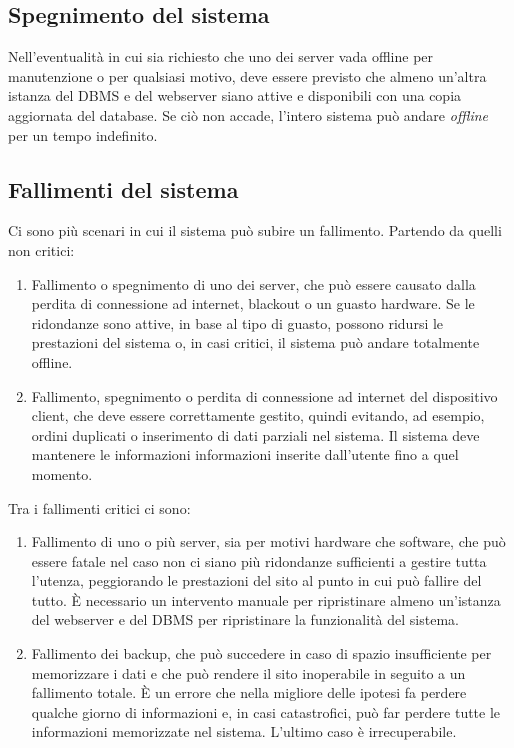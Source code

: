 \documentclass[12pt,a4paper]{article}
\begin{document}
\subsection{Spegnimento del sistema}
Nell'eventualità in cui sia richiesto che uno dei server vada offline per manutenzione o per qualsiasi motivo, deve essere previsto che almeno un'altra istanza del DBMS e del webserver siano attive e disponibili con una copia aggiornata del database. Se ciò non accade, l'intero sistema può andare \emph{offline} per un tempo indefinito.

\subsection{Fallimenti del sistema}
Ci sono più scenari in cui il sistema può subire un fallimento. Partendo da quelli non critici:
\begin{enumerate}
\item Fallimento o spegnimento di uno dei server, che può essere causato dalla perdita di connessione ad internet, blackout o un guasto hardware. Se le ridondanze sono attive, in base al tipo di guasto, possono ridursi le prestazioni del sistema o, in casi critici, il sistema può andare totalmente offline.
\item Fallimento, spegnimento o perdita di connessione ad internet del dispositivo client, che deve essere correttamente gestito, quindi evitando, ad esempio, ordini duplicati o inserimento di dati parziali nel sistema. Il sistema deve mantenere le informazioni informazioni inserite dall'utente fino a quel momento.
\end{enumerate}

Tra i fallimenti critici ci sono:

\begin{enumerate}
\item Fallimento di uno o più server, sia per motivi hardware che software, che può essere fatale nel caso non ci siano più ridondanze sufficienti a gestire tutta l'utenza, peggiorando le prestazioni del sito al punto in cui può fallire del tutto. È necessario un intervento manuale per ripristinare almeno un'istanza del webserver e del DBMS per ripristinare la funzionalità del sistema.
\item Fallimento dei backup, che può succedere in caso di spazio insufficiente per memorizzare i dati e che può rendere il sito inoperabile in seguito a un fallimento totale. È un errore che nella migliore delle ipotesi fa perdere qualche giorno di informazioni e, in casi catastrofici, può far perdere tutte le informazioni memorizzate nel sistema. L'ultimo caso è irrecuperabile.
\end{enumerate}
\end{document}
